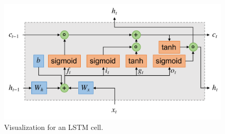 \begin{figure}[!h]
	\centering
	\includegraphics[width=\figf\textwidth]{3-04.pdf}
    \caption[Visualization for an LSTM cell]{Visualization for an LSTM cell.}
    \label{fig:lstmcell}
\end{figure}